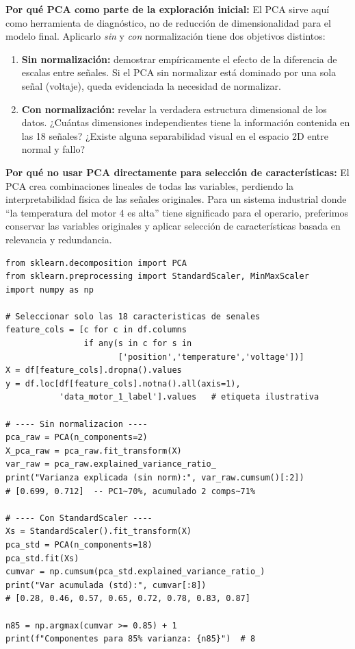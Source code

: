 \documentclass[12pt,a4paper]{article}
\begin{document}
\begin{whybox}
\textbf{Por qué PCA como parte de la exploración inicial:}
El PCA sirve aquí como herramienta de diagnóstico, no de reducción de
dimensionalidad para el modelo final. Aplicarlo \emph{sin} y \emph{con}
normalización tiene dos objetivos distintos:

\begin{enumerate}[leftmargin=1.5em]
  \item \textbf{Sin normalización:} demostrar empíricamente el efecto de la
    diferencia de escalas entre señales. Si el PCA sin normalizar está dominado
    por una sola señal (voltaje), queda evidenciada la necesidad de normalizar.

  \item \textbf{Con normalización:} revelar la verdadera estructura dimensional
    de los datos. ¿Cuántas dimensiones independientes tiene la información contenida
    en las 18 señales? ¿Existe alguna separabilidad visual en el espacio 2D entre
    normal y fallo?
\end{enumerate}

\textbf{Por qué no usar PCA directamente para selección de características:}
El PCA crea combinaciones lineales de todas las variables, perdiendo la
interpretabilidad física de las señales originales. Para un sistema industrial
donde ``la temperatura del motor 4 es alta'' tiene significado para el operario,
preferimos conservar las variables originales y aplicar selección de características
basada en relevancia y redundancia.
\end{whybox}

\begin{lstlisting}[caption={PCA sin y con normalización}, label={lst:pca}]
from sklearn.decomposition import PCA
from sklearn.preprocessing import StandardScaler, MinMaxScaler
import numpy as np

# Seleccionar solo las 18 caracteristicas de senales
feature_cols = [c for c in df.columns
                if any(s in c for s in
                       ['position','temperature','voltage'])]
X = df[feature_cols].dropna().values
y = df.loc[df[feature_cols].notna().all(axis=1),
           'data_motor_1_label'].values   # etiqueta ilustrativa

# ---- Sin normalizacion ----
pca_raw = PCA(n_components=2)
X_pca_raw = pca_raw.fit_transform(X)
var_raw = pca_raw.explained_variance_ratio_
print("Varianza explicada (sin norm):", var_raw.cumsum()[:2])
# [0.699, 0.712]  -- PC1~70%, acumulado 2 comps~71%

# ---- Con StandardScaler ----
Xs = StandardScaler().fit_transform(X)
pca_std = PCA(n_components=18)
pca_std.fit(Xs)
cumvar = np.cumsum(pca_std.explained_variance_ratio_)
print("Var acumulada (std):", cumvar[:8])
# [0.28, 0.46, 0.57, 0.65, 0.72, 0.78, 0.83, 0.87]

n85 = np.argmax(cumvar >= 0.85) + 1
print(f"Componentes para 85% varianza: {n85}")  # 8
\end{lstlisting}
\end{document}
